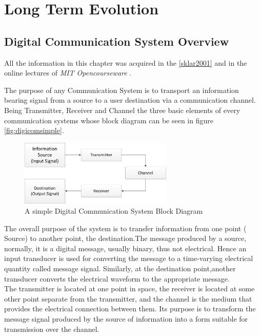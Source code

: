 \chapter{Long Term Evolution}
\label{chap:lte}

\section{Digital Communication System Overview}
\label{lte:digicomm}

All the information in this chapter was acquired in the \ref{sklar2001} and in the
online lectures of \textit{MIT Opencourseware} \cite{ocw:digicomm}.

The purpose of any Communication System is to transport an information bearing
signal from a source to a user destination via a communication channel. Being
Transmitter, Receiver and Channel the three basic elements of every
communication systems whose block diagram can be seen in figure
\ref{fig:digicomsimple}.\\

\begin{figure}[htbp]
    \centering
    \includegraphics[width=0.65\textwidth]{./figures/digicom_simple}
    \caption{ A simple Digital Communication System Block Diagram
    \label{fig:digcomsimple}}
\end{figure}

The overall purpose of the system is to transfer information from one point (
Source) to another point, the destination.The message produced by a source,
normally, it is a digital message, usually binary, thus not electrical. Hence an
input transducer is used for converting the message to a time-varying electrical
quantity called message signal. Similarly, at the destination point,another
transducer converts the electrical waveform to the appropriate message.\\

The transmitter is located at one point in space, the receiver is located at
some other point separate from the transmitter, and the channel is the medium
that provides the electrical connection between them. Its purpose is to
transform the message signal produced by the source of information into a form
suitable for transmission over the channel.\\

